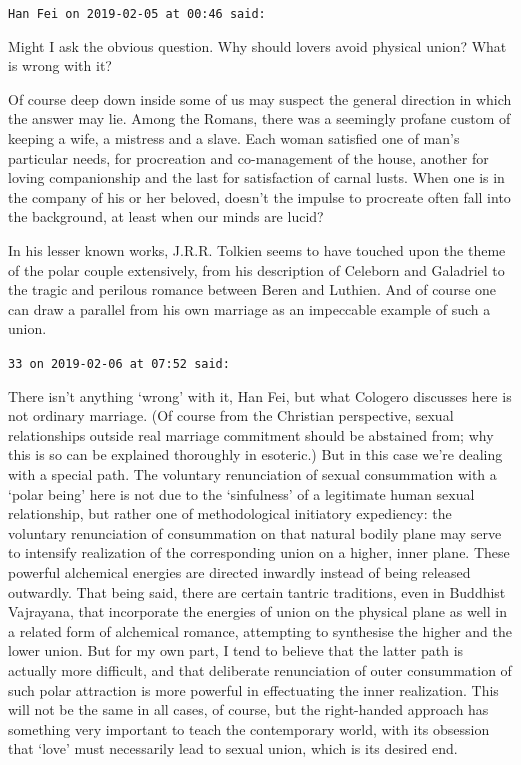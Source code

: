 \begin{footnotesize}\begin{sffamily}



\texttt{Han Fei on 2019-02-05 at 00:46 said: }

Might I ask the obvious question. Why should lovers avoid physical union? What is wrong with it?

Of course deep down inside some of us may suspect the general direction in which the answer may lie. Among the Romans, there was a seemingly profane custom of keeping a wife, a mistress and a slave. Each woman satisfied one of man's particular needs, for procreation and co-management of the house, another for loving companionship and the last for satisfaction of carnal lusts. When one is in the company of his or her beloved, doesn't the impulse to procreate often fall into the background, at least when our minds are lucid? 

In his lesser known works, J.R.R. Tolkien seems to have touched upon the theme of the polar couple extensively, from his description of Celeborn and Galadriel to the tragic and perilous romance between Beren and Luthien. And of course one can draw a parallel from his own marriage as an impeccable example of such a union.


\hfill

\texttt{33 on 2019-02-06 at 07:52 said: }

There isn't anything `wrong' with it, Han Fei, but what Cologero discusses here is not ordinary marriage. (Of course from the Christian perspective, sexual relationships outside real marriage commitment should be abstained from; why this is so can be explained thoroughly in esoteric.) But in this case we're dealing with a special path. The voluntary renunciation of sexual consummation with a `polar being' here is not due to the `sinfulness' of a legitimate human sexual relationship, but rather one of methodological initiatory expediency: the voluntary renunciation of consummation on that natural bodily plane may serve to intensify realization of the corresponding union on a higher, inner plane. These powerful alchemical energies are directed inwardly instead of being released outwardly. That being said, there are certain tantric traditions, even in Buddhist Vajrayana, that incorporate the energies of union on the physical plane as well in a related form of alchemical romance, attempting to synthesise the higher and the lower union. But for my own part, I tend to believe that the latter path is actually more difficult, and that deliberate renunciation of outer consummation of such polar attraction is more powerful in effectuating the inner realization. This will not be the same in all cases, of course, but the right-handed approach has something very important to teach the contemporary world, with its obsession that `love' must necessarily lead to sexual union, which is its desired end.


\end{sffamily}
\end{footnotesize}
